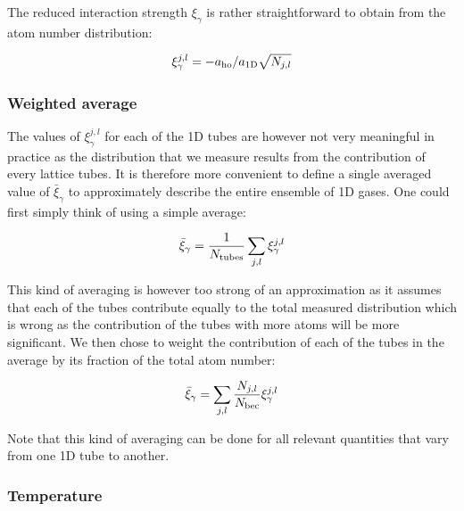 

The reduced interaction strength $\xi_{\gamma}$ is rather straightforward to obtain from the atom number distribution:

\begin{equation}
    \xi_{\gamma}^{j,l}=-a_{\rm{ho}}/a_{\rm{1D}}\sqrt{N_{j,l}}
\end{equation}

\subsubsection{Weighted average}

\noindent The values of $\xi_{\gamma}^{j,l}$ for each of the 1D tubes are however not very meaningful in practice as the distribution that we measure results from the contribution of every lattice tubes. It is therefore more convenient to define a single averaged value of $\bar{\xi}_{\gamma}$ to approximately describe the entire ensemble of 1D gases. One could first simply think of using a simple average:

\begin{equation}
    \bar{\xi}_{\gamma} = \frac{1}{N_{\rm{tubes}}} \sum_{j,l} \xi_{\gamma}^{j,l}
\end{equation}

\noindent This kind of averaging is however too strong of an approximation as it assumes that each of the tubes contribute equally to the total measured distribution which is wrong as the contribution of the tubes with more atoms will be more significant. We then chose to weight the contribution of each of the tubes in the average by its fraction of the total atom number:

\begin{equation}
    \bar{\xi}_{\gamma} = \sum_{j,l} \frac{N_{j,l}}{N_{\rm{bec}}} \xi_{\gamma}^{j,l}
\end{equation}

\noindent Note that this kind of averaging can be done for all relevant quantities that vary from one 1D tube to another.

\subsubsection{Temperature}

